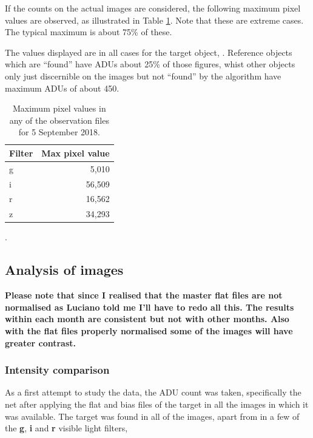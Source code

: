 If the counts on the actual images are considered, the following maximum pixel
values are observed, as illustrated in Table \ref{table:pmaxima}. Note that
these are extreme cases. The typical maximum is about 75\% of these.

The values displayed are in all cases for the target object, \bstar. Reference
objects which are ``found'' have ADUs about 25\% of those figures, whist other
objects only just discernible on the images but not ``found'' by the algorithm
have maximum ADUs of about 450.

\begin{table}[!htbp]
\begin{center}
\begin{tabular}{lr} \hline
Filter & Max pixel value \\\hline
g & 5,010 \\
i & 56,509 \\
r & 16,562 \\
z & 34,293 \\
\hline
\end{tabular}
\end{center}
\caption{Maximum pixel values in any of the observation files for 5 September
2018.}.
\protect\label{table:pmaxima}
\end{table}
\clearpage

\subsection{Analysis of images}
\protect\label{section:analimages}

\textbf{Please note that since I realised that the master flat files are not
normalised as Luciano told me I'll have to redo all this. The results within
each month are consistent but not with other months. Also with the flat files
properly normalised some of the images will have greater contrast.}

\subsubsection{Intensity comparison}
\protect\label{section:intcomp}

As a first attempt to study the data, the ADU count was taken, specifically the
net after applying the flat and bias files of the target in all the images in which it was available.
The target was found in all of the images, apart from in a few of the
\textbf{g}, \textbf{i} and \textbf{r} visible light filters,

